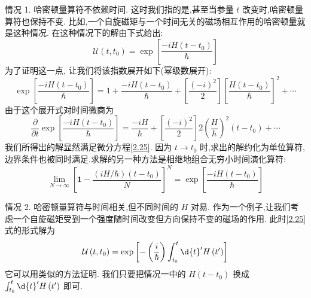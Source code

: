 \documentclass[lang=cn,newtx,10pt,scheme=chinese,thmcnt=section]{elegantbook}
\begin{document}
情况 1. 哈密顿量算符不依赖时间. 这时我们指的是,甚至当参量 $t$ 改变时,哈密顿量算符也保持不变. 比如,一个自旋磁矩与一个时间无关的磁场相互作用的哈密顿量就是这种情况. 在这种情况下的解由下式给出:
\begin{equation}
	\mathcal{U}\left( {t,{t}_{0}}\right) = \exp \left\lbrack \frac{-{iH}\left( {t - {t}_{0}}\right) }{\hbar }\right\rbrack
\end{equation}
为了证明这一点, 让我们将该指数展开如下(幂级数展开):
\begin{equation}
	\exp \left\lbrack \frac{-{iH}\left( {t - {t}_{0}}\right) }{\hbar }\right\rbrack = 1 + \frac{-{iH}\left( {t - {t}_{0}}\right) }{\hbar } + \left\lbrack \frac{{\left( -i\right) }^{2}}{2}\right\rbrack {\left\lbrack \frac{H\left( {t - {t}_{0}}\right) }{\hbar }\right\rbrack }^{2} + \cdots
\end{equation}
由于这个展开式对时间微商为
\begin{equation}
	\frac{\partial }{\partial t}\exp \left\lbrack \frac{-{iH}\left( {t - {t}_{0}}\right) }{\hbar }\right\rbrack = \frac{-{iH}}{\hbar } + \left\lbrack \frac{{\left( -i\right) }^{2}}{2}\right\rbrack 2{\left( \frac{H}{\hbar }\right) }^{2}\left( {t - {t}_{0}}\right) + \cdots
\end{equation}
我们所得出的解显然满足微分方程\ref{2.25}. 因为 $t \rightarrow {t}_{0}$ 时,求出的解约化为单位算符, 边界条件也被同时满足.求解的另一种方法是相继地组合无穷小时间演化算符:
\begin{equation}
	\mathop{\lim }\limits_{{N \rightarrow \infty }}{\left\lbrack \textbf{1} - \frac{\left( {{iH}/\hbar }\right) \left( {t - {t}_{0}}\right) }{N}\right\rbrack }^{N} = \exp \left\lbrack \frac{-{iH}\left( {t - {t}_{0}}\right) }{\hbar }\right\rbrack
\end{equation}

情况 2. 哈密顿量算符与时间相关,但不同时间的 $H$ 对易. 作为一个例子,让我们考虑一个自旋磁矩受到一个强度随时间改变但方向保持不变的磁场的作用. 此时\ref{2.25}式的形式解为
\begin{equation}
	\mathcal{U}\left( {t,{t}_{0}}\right) = \exp \left\lbrack {-\left( \frac{i}{\hbar }\right) \int_{{t}_{0}}^{t}\d{t}^{\prime }H\left( {t}^{\prime }\right) }\right\rbrack
\end{equation}
它可以用类似的方法证明. 我们只要把情况一中的 $H\left( {t - {t}_{0}}\right)$ 换成 $\int_{{t}_{0}}^{t}\d{t}^{\prime }H\left( {t}^{\prime }\right)$ 即可.
\end{document}
